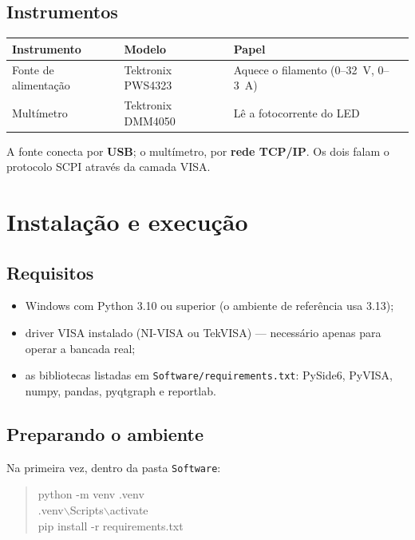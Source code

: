 \documentclass[11pt,a4paper]{article}
\begin{document}
\subsection{Instrumentos}

\begin{center}
\begin{tabular}{@{}lll@{}}
\toprule
\textbf{Instrumento} & \textbf{Modelo} & \textbf{Papel} \\
\midrule
Fonte de alimentação & Tektronix PWS4323 & Aquece o filamento (0--32~V, 0--3~A) \\
Multímetro & Tektronix DMM4050 & Lê a fotocorrente do LED \\
\bottomrule
\end{tabular}
\end{center}

A fonte conecta por \textbf{USB}; o multímetro, por \textbf{rede TCP/IP}. Os
dois falam o protocolo SCPI através da camada VISA.

\section{Instalação e execução}

\subsection{Requisitos}

\begin{itemize}[nosep]
  \item Windows com Python 3.10 ou superior (o ambiente de referência usa 3.13);
  \item driver VISA instalado (NI-VISA ou TekVISA) --- necessário apenas para
        operar a bancada real;
  \item as bibliotecas listadas em \texttt{Software/requirements.txt}:
        PySide6, PyVISA, numpy, pandas, pyqtgraph e reportlab.
\end{itemize}

\subsection{Preparando o ambiente}

Na primeira vez, dentro da pasta \texttt{Software}:

\begin{quote}\ttfamily
python -m venv .venv\\
.venv$\backslash$Scripts$\backslash$activate\\
pip install -r requirements.txt
\end{quote}
\end{document}
